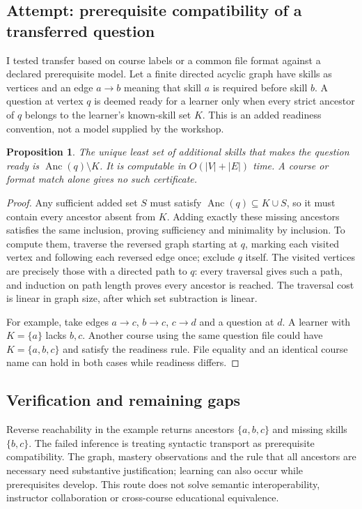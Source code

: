 \documentclass[11pt]{article}
\newtheorem{proposition}{Proposition}
\begin{document}
\subsection{Attempt: prerequisite compatibility of a transferred question}
I tested transfer based on course labels or a common file format against a declared prerequisite model. Let a finite directed acyclic graph have skills as vertices and an edge $a\to b$ meaning that skill $a$ is required before skill $b$. A question at vertex $q$ is deemed ready for a learner only when every strict ancestor of $q$ belongs to the learner's known-skill set $K$. This is an added readiness convention, not a model supplied by the workshop.
\begin{proposition}
The unique least set of additional skills that makes the question ready is $\operatorname{Anc}(q)\setminus K$. It is computable in $O(|V|+|E|)$ time. A course or format match alone gives no such certificate.
\end{proposition}
\begin{proof}
Any sufficient added set $S$ must satisfy $\operatorname{Anc}(q)\subseteq K\cup S$, so it must contain every ancestor absent from $K$. Adding exactly these missing ancestors satisfies the same inclusion, proving sufficiency and minimality by inclusion. To compute them, traverse the reversed graph starting at $q$, marking each visited vertex and following each reversed edge once; exclude $q$ itself. The visited vertices are precisely those with a directed path to $q$: every traversal gives such a path, and induction on path length proves every ancestor is reached. The traversal cost is linear in graph size, after which set subtraction is linear.

For example, take edges $a\to c$, $b\to c$, $c\to d$ and a question at $d$. A learner with $K=\{a\}$ lacks $b,c$. Another course using the same question file could have $K=\{a,b,c\}$ and satisfy the readiness rule. File equality and an identical course name can hold in both cases while readiness differs.
\end{proof}
\subsection{Verification and remaining gaps}
Reverse reachability in the example returns ancestors $\{a,b,c\}$ and missing skills $\{b,c\}$. The failed inference is treating syntactic transport as prerequisite compatibility. The graph, mastery observations and the rule that all ancestors are necessary need substantive justification; learning can also occur while prerequisites develop. This route does not solve semantic interoperability, instructor collaboration or cross-course educational equivalence.
\end{document}
